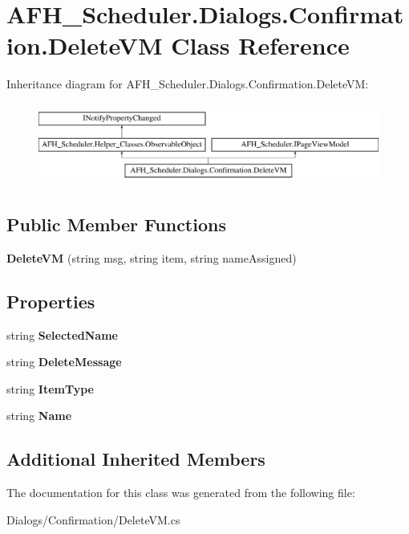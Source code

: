 \section{A\+F\+H\+\_\+\+Scheduler.\+Dialogs.\+Confirmation.\+Delete\+VM Class Reference}
\label{class_a_f_h___scheduler_1_1_dialogs_1_1_confirmation_1_1_delete_v_m}
Inheritance diagram for A\+F\+H\+\_\+\+Scheduler.\+Dialogs.\+Confirmation.\+Delete\+VM\+:\begin{figure}[H]
\begin{center}
\leavevmode
\includegraphics[height=2.700965cm]{class_a_f_h___scheduler_1_1_dialogs_1_1_confirmation_1_1_delete_v_m}
\end{center}
\end{figure}
\subsection*{Public Member Functions}
\begin{DoxyCompactItemize}
\item 
\mbox{\label{class_a_f_h___scheduler_1_1_dialogs_1_1_confirmation_1_1_delete_v_m_abe9b6638e224ee974e8f6cf61f362ea6}} 
{\bfseries Delete\+VM} (string msg, string item, string name\+Assigned)
\end{DoxyCompactItemize}
\subsection*{Properties}
\begin{DoxyCompactItemize}
\item 
\mbox{\label{class_a_f_h___scheduler_1_1_dialogs_1_1_confirmation_1_1_delete_v_m_a660cd0228d97325b04f016dec91b8b05}} 
string {\bfseries Selected\+Name}\hspace{0.3cm}{\ttfamily  [get, set]}
\item 
\mbox{\label{class_a_f_h___scheduler_1_1_dialogs_1_1_confirmation_1_1_delete_v_m_a8be04777494feceb7d7eb359806fa42e}} 
string {\bfseries Delete\+Message}\hspace{0.3cm}{\ttfamily  [get, set]}
\item 
\mbox{\label{class_a_f_h___scheduler_1_1_dialogs_1_1_confirmation_1_1_delete_v_m_af5a777ec92984106d40d3ba2814fa26d}} 
string {\bfseries Item\+Type}\hspace{0.3cm}{\ttfamily  [get, set]}
\item 
\mbox{\label{class_a_f_h___scheduler_1_1_dialogs_1_1_confirmation_1_1_delete_v_m_aac890d98be5881ee95074c8061cee7d0}} 
string {\bfseries Name}\hspace{0.3cm}{\ttfamily  [get]}
\end{DoxyCompactItemize}
\subsection*{Additional Inherited Members}


The documentation for this class was generated from the following file\+:\begin{DoxyCompactItemize}
\item 
Dialogs/\+Confirmation/Delete\+V\+M.\+cs\end{DoxyCompactItemize}
